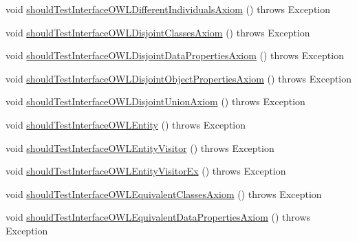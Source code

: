 \begin{DoxyCompactItemize}
\item 
void \hyperlink{classorg_1_1semanticweb_1_1owlapi_1_1contract_1_1_contract_owlapi_model__2_test_ae75fa6a38d892e822ff306ed35159e6a}{should\-Test\-Interface\-O\-W\-L\-Different\-Individuals\-Axiom} ()  throws Exception 
\item 
void \hyperlink{classorg_1_1semanticweb_1_1owlapi_1_1contract_1_1_contract_owlapi_model__2_test_ad599c02b4beaea1bbda78fc868cb0ca9}{should\-Test\-Interface\-O\-W\-L\-Disjoint\-Classes\-Axiom} ()  throws Exception 
\item 
void \hyperlink{classorg_1_1semanticweb_1_1owlapi_1_1contract_1_1_contract_owlapi_model__2_test_ad052bcc0af45a0549ee4d7af9bc3dfb5}{should\-Test\-Interface\-O\-W\-L\-Disjoint\-Data\-Properties\-Axiom} ()  throws Exception 
\item 
void \hyperlink{classorg_1_1semanticweb_1_1owlapi_1_1contract_1_1_contract_owlapi_model__2_test_a52729f2a38ed4cf0591d9fd856a76e83}{should\-Test\-Interface\-O\-W\-L\-Disjoint\-Object\-Properties\-Axiom} ()  throws Exception 
\item 
void \hyperlink{classorg_1_1semanticweb_1_1owlapi_1_1contract_1_1_contract_owlapi_model__2_test_a8878ab7580edcf7c7d1ba36b615f143d}{should\-Test\-Interface\-O\-W\-L\-Disjoint\-Union\-Axiom} ()  throws Exception 
\item 
void \hyperlink{classorg_1_1semanticweb_1_1owlapi_1_1contract_1_1_contract_owlapi_model__2_test_ae0db33f3374bd0c1531f9d5b32b633e5}{should\-Test\-Interface\-O\-W\-L\-Entity} ()  throws Exception 
\item 
void \hyperlink{classorg_1_1semanticweb_1_1owlapi_1_1contract_1_1_contract_owlapi_model__2_test_a1a1e2a54bfc7e5b384a2e935fcd65d0c}{should\-Test\-Interface\-O\-W\-L\-Entity\-Visitor} ()  throws Exception 
\item 
void \hyperlink{classorg_1_1semanticweb_1_1owlapi_1_1contract_1_1_contract_owlapi_model__2_test_a47f9ce7e5f7cae5b49347cbe520f284e}{should\-Test\-Interface\-O\-W\-L\-Entity\-Visitor\-Ex} ()  throws Exception 
\item 
void \hyperlink{classorg_1_1semanticweb_1_1owlapi_1_1contract_1_1_contract_owlapi_model__2_test_af512f22fcfedf59815cd7f957f41fb4c}{should\-Test\-Interface\-O\-W\-L\-Equivalent\-Classes\-Axiom} ()  throws Exception 
\item 
void \hyperlink{classorg_1_1semanticweb_1_1owlapi_1_1contract_1_1_contract_owlapi_model__2_test_a631c6d0be5087f4ec7d62f2c4acc79b0}{should\-Test\-Interface\-O\-W\-L\-Equivalent\-Data\-Properties\-Axiom} ()  throws Exception 

\end{DoxyCompactItemize}
